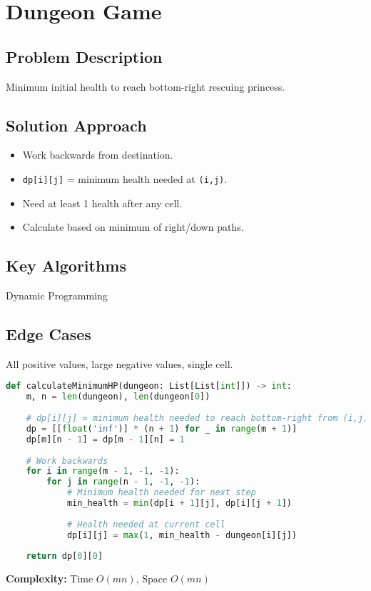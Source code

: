 \documentclass[10pt, a4paper]{article}
\begin{document}
\section{Dungeon Game}
\subsection*{Problem Description}
Minimum initial health to reach bottom-right rescuing princess.

\subsection*{Solution Approach}
\begin{itemize}
    \item Work backwards from destination.
    \item \texttt{dp[i][j]} = minimum health needed at \texttt{(i,j)}.
    \item Need at least 1 health after any cell.
    \item Calculate based on minimum of right/down paths.
\end{itemize}

\subsection*{Key Algorithms}
Dynamic Programming

\subsection*{Edge Cases}
All positive values, large negative values, single cell.

\begin{lstlisting}[language=Python]
def calculateMinimumHP(dungeon: List[List[int]]) -> int:
    m, n = len(dungeon), len(dungeon[0])
    
    # dp[i][j] = minimum health needed to reach bottom-right from (i,j)
    dp = [[float('inf')] * (n + 1) for _ in range(m + 1)]
    dp[m][n - 1] = dp[m - 1][n] = 1
    
    # Work backwards
    for i in range(m - 1, -1, -1):
        for j in range(n - 1, -1, -1):
            # Minimum health needed for next step
            min_health = min(dp[i + 1][j], dp[i][j + 1])
            
            # Health needed at current cell
            dp[i][j] = max(1, min_health - dungeon[i][j])
    
    return dp[0][0]
\end{lstlisting}
\textbf{Complexity:} Time $O(mn)$, Space $O(mn)$
\end{document}
